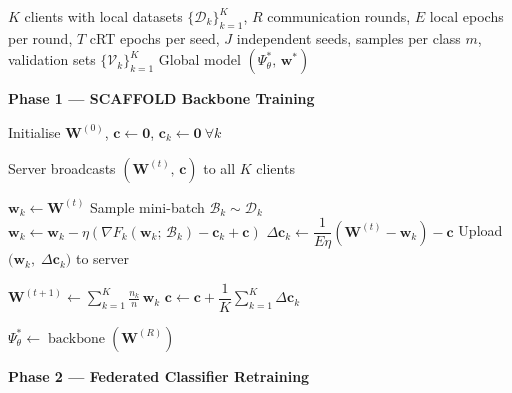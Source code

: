 \begin{algorithm}[htbp]
\caption{FedSCRT: Federated Staged Classifier Retraining}
\label{alg:fedscrt}
\begin{algorithmic}[1]
\Require $K$ clients with local datasets $\{\mathcal{D}_k\}_{k=1}^K$,
         $R$ communication rounds,
         $E$ local epochs per round,
         $T$ cRT epochs per seed,
         $J$ independent seeds,
         samples per class $m$,
         validation sets $\{\mathcal{V}_k\}_{k=1}^K$
\Ensure  Global model $(\Psi^*_\theta,\, \mathbf{w}^*)$

\Statex
\Statex \textbf{Phase 1 --- SCAFFOLD Backbone Training}
\Statex \hrulefill

\State Initialise $\mathbf{W}^{(0)}$,\;
       $\mathbf{c} \leftarrow \mathbf{0}$,\;
       $\mathbf{c}_k \leftarrow \mathbf{0}\ \forall k$

  \State Server broadcasts $(\mathbf{W}^{(t)},\, \mathbf{c})$
         to all $K$ clients

    \State $\mathbf{w}_k \leftarrow \mathbf{W}^{(t)}$
      \State Sample mini-batch
             $\mathcal{B}_k \sim \mathcal{D}_k$
      \State $\mathbf{w}_k \leftarrow \mathbf{w}_k
             - \eta\!\left(
               \nabla F_k(\mathbf{w}_k;\,\mathcal{B}_k)
               - \mathbf{c}_k + \mathbf{c}
             \right)$
    \EndFor
    \State $\Delta\mathbf{c}_k \leftarrow
           \dfrac{1}{E\eta}
           \!\left(\mathbf{W}^{(t)} - \mathbf{w}_k\right)
           - \mathbf{c}$
    \State Upload $\bigl(\mathbf{w}_k,\;
           \Delta\mathbf{c}_k\bigr)$ to server
  \EndFor

  \State $\mathbf{W}^{(t+1)} \leftarrow
         \displaystyle\sum_{k=1}^K
         \frac{n_k}{n}\,\mathbf{w}_k$
  \State $\mathbf{c} \leftarrow
         \mathbf{c} +
         \dfrac{1}{K}
         \displaystyle\sum_{k=1}^K
         \Delta\mathbf{c}_k$
\EndFor

\State $\Psi^*_\theta \leftarrow
       \operatorname{backbone}\!\left(\mathbf{W}^{(R)}\right)$

\Statex
\Statex \textbf{Phase 2 --- Federated Classifier Retraining}
\Statex \hrulefill


\end{algorithmic}
\end{algorithm}
